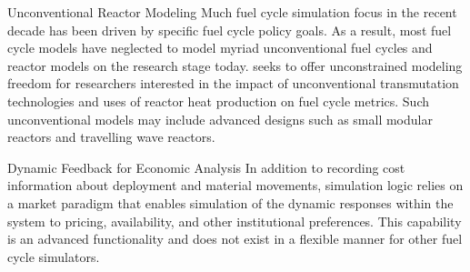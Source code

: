 Unconventional Reactor Modeling
Much fuel cycle simulation focus in the recent decade has been driven by specific fuel cycle policy goals. As a result, most fuel cycle models have neglected to model myriad unconventional fuel cycles and reactor models on the research stage today. \Cyclus seeks to offer unconstrained modeling freedom for researchers interested in the impact of unconventional transmutation technologies and uses of reactor heat production on fuel cycle metrics. Such unconventional models may include advanced designs such as small modular reactors and travelling wave reactors.

Dynamic Feedback for Economic Analysis
In addition to recording cost information about deployment and material movements, \Cyclus simulation logic relies on a market paradigm that enables simulation of the dynamic responses within the system to pricing, availability, and other institutional preferences. This capability is an advanced functionality and does not exist in a flexible manner for other fuel cycle simulators.


